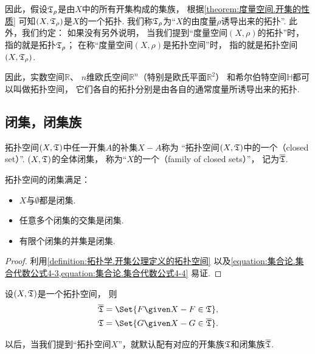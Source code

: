 因此，假设\({\mathfrak T}_\rho\)是由\(X\)中的所有开集构成的集族，
根据\cref{theorem:度量空间.开集的性质} 可知\((X,{\mathfrak T}_\rho)\)是\(X\)的一个拓扑.
我们称\({\mathfrak T}_\rho\)为“\(X\)的由度量\(\rho\)诱导出来的拓扑”.
此外，我们约定：
如果没有另外说明，
当我们提到“度量空间\((X,\rho)\)的拓扑”时，
指的就是拓扑\({\mathfrak T}_\rho\)；
在称“度量空间\((X,\rho)\)是拓扑空间”时，
指的就是拓扑空间\((X,{\mathfrak T}_\rho)\).

因此，实数空间\(\mathbb{R}\)、
\(n\)维欧氏空间\(\mathbb{R}^n\)（特别是欧氏平面\(\mathbb{R}^2\)）
和希尔伯特空间\(\mathbb{H}\)都可以叫做拓扑空间，
它们各自的拓扑分别是由各自的通常度量所诱导出来的拓扑.

\subsection{闭集，闭集族}
\begin{definition}\label{definition:拓扑空间.闭集的定义}
拓扑空间\((X,{\mathfrak T})\)中任一开集\(A\)的补集\(X-A\)称为
“拓扑空间\((X,{\mathfrak T})\)中的一个（closed set）”.
\((X,{\mathfrak T})\)的全体闭集，
称为“\(X\)的一个（family of closed sets）”，
记为\(\overline{{\mathfrak T}}\).
\end{definition}

\begin{property}
拓扑空间的闭集满足：\begin{itemize}
	\item \(X\)与\(\emptyset\)都是闭集.
	\item 任意多个闭集的交集是闭集.
	\item 有限个闭集的并集是闭集.
\end{itemize}
\begin{proof}
利用\cref{definition:拓扑学.开集公理定义的拓扑空间}
以及\cref{equation:集合论.集合代数公式4-3,equation:集合论.集合代数公式4-4}
易证.
\end{proof}
\end{property}

\begin{theorem}
设\((X,{\mathfrak T})\)是一个拓扑空间，
则\begin{gather*}
	\oT = \Set{ F \given X-F \in \T }, \\
	\T = \Set{ G \given X-G \in \oT }.
\end{gather*}
\end{theorem}
以后，当我们提到“拓扑空间\(X\)”，就默认配有对应的开集族\({\mathfrak T}\)和闭集族\(\overline{{\mathfrak T}}\).

